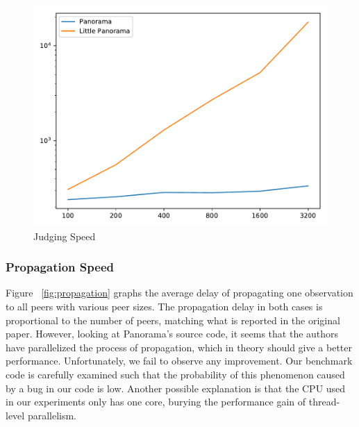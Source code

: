 \begin{figure}[!tb]
\centering
\includegraphics[scale=0.4]{figs/inference.pdf}
\vspace{-1em}
\caption{Judging Speed
\label{fig:judge}
}
\end{figure}

\subsubsection{Propagation Speed} Figure ~\ref{fig:propagation} graphs the average delay of propagating one observation to all peers with various peer sizes. The propagation delay in both cases is proportional to the number of peers, matching what is reported in the original paper. However, looking at Panorama's source code, it seems that the authors have parallelized the process of propagation, which in theory should give a better performance. Unfortunately, we fail to observe any improvement. Our benchmark code is carefully examined such that the probability of this phenomenon caused by a bug in our code is low. Another possible explanation is that the CPU used in our experiments only has one core, burying the performance gain of thread-level parallelism.

